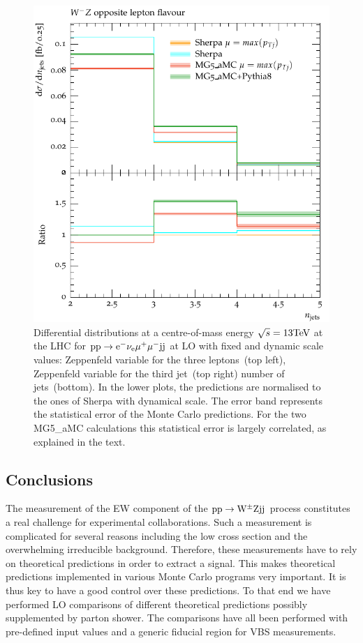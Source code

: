 \documentclass[11pt]{cernrep}
\begin{document}
\begin{figure}[htbp]
\begin{center}
   \includegraphics[scale=0.65]{figs/dyn_WmZ_OF_nJets}
\caption{Differential distributions at a centre-of-mass energy $\sqrt{s}=13{\rm TeV}$ at the LHC for ${\rm p} {\rm p} \to {\rm e}^-  \nu_{\rm e}  \mu^+ \mu^- {\rm j} {\rm j}$ at LO with fixed and dynamic scale values: 
                Zeppenfeld variable for the three leptons~(top left),
                Zeppenfeld variable for the third jet~(top right)
                number of jets~(bottom).
                In the lower plots, the predictions are normalised to the ones of {\sc Sherpa} with dynamical scale. The error band represents
                the statistical error of the Monte Carlo predictions. For the two {\sc MG5\_aMC}
                calculations this statistical error is largely correlated, as explained in the text.}
\label{vbs_fig_shower_2b}
\end{center}
\end{figure}

\subsection{Conclusions \label{vbs_concl}}

The measurement of the EW component of the ${\rm p}{\rm p} \to {\rm W}^{\pm}{\rm Z}{\rm j}{\rm j}$ process constitutes a real challenge for experimental collaborations.
Such a measurement is complicated for several reasons including the low cross section and the overwhelming irreducible background.
Therefore, these measurements have to rely on theoretical predictions in order to extract a signal.
This makes theoretical predictions implemented in various Monte Carlo programs very important.
It is thus key to have a good control over these predictions.
To that end we have performed LO comparisons of different theoretical predictions possibly supplemented by parton shower.
The comparisons have all been performed with pre-defined input values and a generic fiducial region for VBS measurements.
\end{document}
